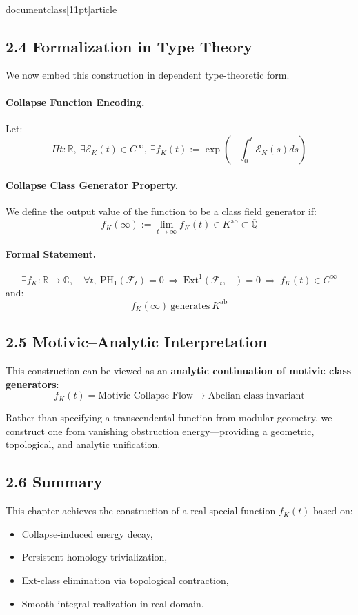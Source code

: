 \\documentclass[11pt]{article}
\begin{document}
\subsection*{2.4 Formalization in Type Theory}

We now embed this construction in dependent type-theoretic form.

\paragraph{Collapse Function Encoding.}
Let:
\[
\boxed{
\Pi t : \mathbb{R},\ \exists \mathcal{E}_K(t) \in C^\infty,\ \exists f_K(t) := \exp\left(-\int_0^t \mathcal{E}_K(s)ds\right)
}
\]

\paragraph{Collapse Class Generator Property.}
We define the output value of the function to be a class field generator if:
\[
f_K(\infty) := \lim_{t \to \infty} f_K(t) \in K^{\mathrm{ab}} \subset \overline{\mathbb{Q}}
\]

\paragraph{Formal Statement.}
\[
\exists f_K : \mathbb{R} \to \mathbb{C},\quad \forall t,\ \mathrm{PH}_1(\mathcal{F}_t) = 0\ \Rightarrow\ \mathrm{Ext}^1(\mathcal{F}_t, -) = 0\ \Rightarrow\ f_K(t) \in C^\infty
\]
and:
\[
f_K(\infty)\ \text{generates}\ K^{\mathrm{ab}}
\]

\subsection*{2.5 Motivic–Analytic Interpretation}

This construction can be viewed as an \textbf{analytic continuation of motivic class generators}:
\[
f_K(t) = \text{Motivic Collapse Flow} \longrightarrow \text{Abelian class invariant}
\]

Rather than specifying a transcendental function from modular geometry, we construct one from vanishing obstruction energy—providing a geometric, topological, and analytic unification.

\subsection*{2.6 Summary}

This chapter achieves the construction of a real special function \( f_K(t) \) based on:
\begin{itemize}
    \item Collapse-induced energy decay,
    \item Persistent homology trivialization,
    \item Ext-class elimination via topological contraction,
    \item Smooth integral realization in real domain.
\end{itemize}
\end{document}
